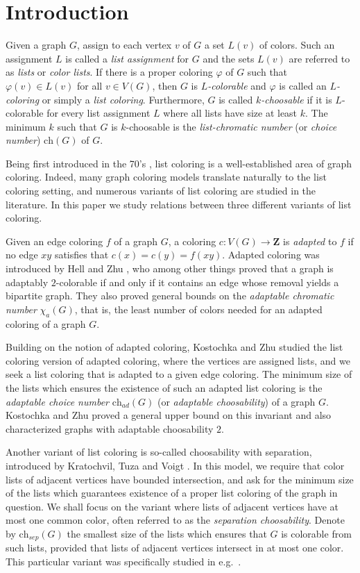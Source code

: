 \documentclass[12pt]{article}
\newcommand{\ch}{\mathrm{ch}}
\begin{document}
\section{Introduction}
	  Given a graph $G$, assign to each vertex $v$ of $G$ a set
        $L(v)$ of colors.
	Such an assignment $L$ is called a 
    \emph{list assignment} for $G$ and
    the sets $L(v)$ are referred
    to as \emph{lists} or \emph{color lists}.
    If there is a proper coloring $\varphi$ of $G$ such that 
    $\varphi(v) \in L(v)$ for all $v \in V(G)$, then
	$G$ is \emph{$L$-colorable} and $\varphi$
    is called an \emph{$L$-coloring} or simply a {\em list coloring}. 
	Furthermore, $G$ is
    called \emph{$k$-choosable} if it is $L$-colorable
    for every list assignment $L$ where all lists have size at least $k$. 
	The minimum $k$ such that $G$ is $k$-choosable is the 
	{\em list-chromatic number} (or {\em choice number})  $\ch(G)$ of $G$.
	
Being first introduced in the 70's \cite{ERT, Vizing}, list coloring is a well-established area of graph coloring. Indeed, many graph coloring models  translate naturally to the list coloring setting, and numerous variants of list coloring are studied in the literature. In this paper we study relations between three different variants of list coloring.

Given an edge coloring $f$ of a graph $G$, a coloring $c : V(G) \to \mathbf{Z}$ is {\em adapted} to $f$ if no edge $xy$ satisfies
that $c(x) = c(y) = f(xy)$. Adapted coloring was introduced by
Hell and Zhu \cite{HellZhu}, who
among other things proved that a graph is adaptably $2$-colorable
if and only if it contains an edge whose removal yields a bipartite graph. They also proved general bounds on the 
{\em adaptable chromatic number} $\chi_a(G)$,
that is, the least number of colors needed for an adapted coloring of a graph $G$.

Building on the notion of adapted coloring, Kostochka and Zhu
\cite{KostochkaZhu} studied the list coloring version of adapted coloring, where the vertices are assigned lists, and we seek
a list coloring that is adapted to a given edge coloring. The minimum size of the lists which ensures the existence of such an
adapted list coloring is the {\em adaptable choice number}
$\ch_{ad}(G)$ (or {\em adaptable choosability}) of a graph $G$. Kostochka and Zhu proved a general upper bound on this invariant and also characterized graphs with adaptable choosability $2$.


Another variant of list coloring is so-called
choosability with separation, introduced by Kratochvil, Tuza and Voigt
\cite{KratochvilTuzaVoigt}. In this model, we require that color lists of adjacent vertices have bounded intersection,
and ask for the minimum size of the lists which guarantees existence of a proper list coloring of the graph in question.
We shall focus on the variant where lists of adjacent vertices have
at most one common color, often referred to as the {\em separation choosability}.
Denote by $\ch_{sep}(G)$ the smallest size of the lists which ensures that $G$ is colorable
from such lists, provided that lists of adjacent vertices intersect in at most one color. This
particular variant was specifically studied in e.g.\ \cite{EsperetKangThomasse, FurediKostochkaKumbhat}.
\end{document}
